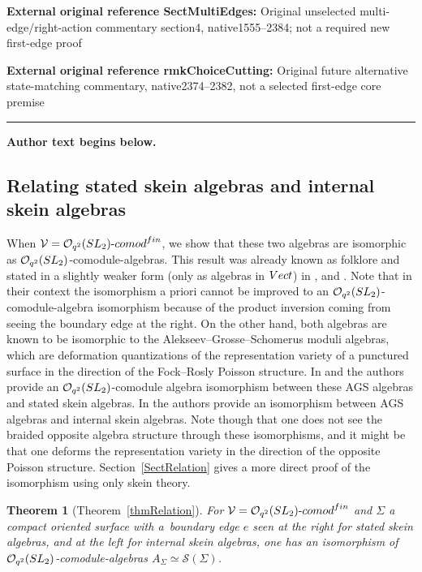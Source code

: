 \documentclass[11pt]{article}
\numberwithin{equation}{section}
\numberwithin{equation}{section}
\newtheorem{Theorem}{Theorem}[section]
\newcommand{\Oqcomfin}{\Oq\text{-}{\rm comod}^{\rm fin}}
\newcommand{\Oq}{\mathcal{O}_{q^2}({\rm SL}_2)}
\begin{document}
\noindent\textbf{External original reference SectMultiEdges:} Original unselected multi-edge/right-action commentary section4, native1555–2384; not a required new first-edge proof\par
\noindent\textbf{External original reference rmkChoiceCutting:} Original future alternative state-matching commentary, native2374–2382, not a selected first-edge core premise\par
\medskip\hrule\medskip\noindent\textbf{Author text begins below.}\par
\setcounter{section}{1}\setcounter{Theorem}{0}
\subsection*{Relating stated skein algebras and internal skein algebras} When $\mathcal{V} = \Oqcomfin$, we show that these two algebras are isomorphic as $\Oq$-comodule-algebras. This result was already known as folklore and stated in a slightly weaker form (only as algebras in $\rm Vect$) in \cite[Theorem~4.4]{LeYu}, \cite[Theorem~9.1]{LeSikora} and \cite[Remark 2.21]{Gunningham}. Note that in their context the isomorphism a priori cannot be improved to an $\Oq$-comodule-algebra isomorphism because of the product inversion coming from seeing the boundary edge at the right. On the other hand, both algebras are known to be isomorphic to the Alekseev--Grosse--Schomerus moduli algebras, which are deformation quantizations of the representation variety of a punctured surface in the direction of the Fock--Rosly Poisson structure. In \cite[Theorem~5.3]{Faitg} and \cite{Korinman} the authors provide an $\Oq$-comodule algebra isomorphism between these AGS algebras and stated skein algebras. In \cite[Section~7]{BBJ} the authors provide an isomorphism between AGS algebras and internal skein algebras. Note though that one does not see the braided opposite algebra structure through these isomorphisms, and it might be that one deforms the representation variety in the direction of the opposite Poisson structure. Section~\ref{SectRelation} gives a more direct proof of the isomorphism using only skein theory.
\begin{Theorem}[Theorem~\ref{thmRelation}]
For $\mathcal{V} = \Oqcomfin$ and $\Sigma$ a compact oriented surface with a~boundary edge $e$ seen at the right for stated skein algebras, and at the left for internal skein algebras, one has an isomorphism of $\Oq$-comodule-algebras $A_\Sigma \simeq \mathscr{S}(\Sigma)$.
\end{Theorem}
\end{document}
